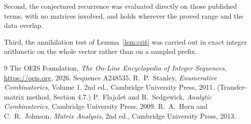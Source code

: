 \documentclass[11pt,a4paper]{article}
\theoremstyle{plain}
\theoremstyle{definition}
\begin{document}
Second, the conjectured recurrence was evaluated directly on those published terms, with no
matrices involved, and holds wherever the proved range and the data overlap.

Third, the annihilation test of Lemma~\ref{lem:crit} was carried out in exact integer
arithmetic on the whole vector rather than on a sampled prefix.

\begin{thebibliography}{9}
 The OEIS Foundation, \emph{The On-Line Encyclopedia of Integer
Sequences}, \url{https://oeis.org}, 2026. Sequence A248535.
 R.~P.~Stanley, \emph{Enumerative Combinatorics}, Volume 1, 2nd ed.,
Cambridge University Press, 2011. (Transfer-matrix method, Section 4.7.)
 P.~Flajolet and R.~Sedgewick, \emph{Analytic Combinatorics}, Cambridge
University Press, 2009.
 R.~A.~Horn and C.~R.~Johnson, \emph{Matrix Analysis}, 2nd ed., Cambridge
University Press, 2013.
\end{thebibliography}
\end{document}
